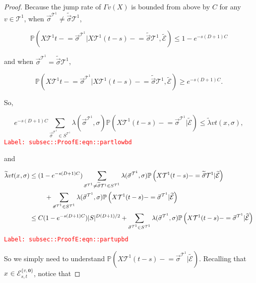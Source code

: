\documentclass[12pt]{article}
\newcommand{\mb}{\mathbb}
\newcommand{\mc}{\mathcal}
\newcommand{\tr}{\textcolor{red}}
\newcommand{\labe}[1]{\tr{\texttt{Label: #1}}}
\newcommand{\pr}{\mb{P}}							%
\renewcommand{\root}{\mathbf{0}}				%
\renewcommand{\v}{v}							%
\renewcommand{\S}{S}							%
\newcommand{\s}{\sigma}							%
\newcommand{\sv}{\vec{\s}}						%
\newcommand{\x}{x}								%
\renewcommand{\t}{t}							%
\renewcommand{\tt}{s}							%
\newcommand{\X}{X}								%
\newcommand{\carp}[1]{^{#1}}					%
\newcommand{\vsi}[1]{^{#1}}						%
\newcommand{\cind}[1]{_{#1}}					%
\newcommand{\tip}[1]{#1}						%
\newcommand{\const}{C}							%
\newcommand{\degr}{D}							%
\newcommand{\tree}{\mc{T}}						%
\newcommand{\sln}[1]{^{#1}}						%
\newcommand{\rate}{\lambda}						%
\newcommand{\alt}[1]{\widetilde{#1}}			%
\newcommand{\evnt}{\mc{E}}						%
\newcommand{\pmap}{\Gamma}						%
\newcommand{\crate}{\alt{\lambda}}				%
\begin{document}
\begin{proof}
Because the jump rate of \(\pmap{\v}(\X{}{})\) is bounded from above by \(\const{}\) for any \(\v\in\tree\sln{1}\),  when \(\sv\cind{}\vsi{\tree\sln{1}}\neq\alt{\sv}{}{\tree\sln{1}}\), 

\[\pr\left(\X{\tree\sln{1}}{\t-} = \sv\cind{}\vsi{\tree\sln{1}}|\X{\tree\sln{1}}{(\t-\tt)-}=\alt{\sv}{}{\tree\sln{1}},\alt{\evnt}{	}\right) \leq 1-e^{-\tt(\degr+1)\const{}}\]

and when \(\sv\cind{}\vsi{\tree\sln{1}}=\alt{\sv}{}{\tree\sln{1}}\),

\[\pr\left(\X{\tree\sln{1}}{\t-} = \sv\cind{}\vsi{\tree\sln{1}}|\X{\tree\sln{1}}{(\t-\tt)-}=\alt{\sv}{}{\tree\sln{1}},\alt{\evnt}{	}\right) \geq e^{-\tt(\degr+1)\const{}}.\]

So,

\begin{equation}
e^{-\tt(\degr+1)\const{}}\sum_{\sv\cind{}\vsi{\tree\sln{1}}\in \S\carp{\tree\sln{1}}} \rate{}(\sv\cind{}\vsi{\tree\sln{1}},\s)\pr\left(\X{\tree\sln{1}}{(\t-\tt)-}=\sv\cind{}\vsi{\tree\sln{1}}|\alt{\evnt}{	}\right) \leq \crate{\v}{\t}(\x\cind{}\tip{},\s),
\label{subsec::ProofE:eqn::partlowbd}
\end{equation}
\labe{subsec::ProofE:eqn::partlowbd}

and

\begin{align}
\crate{\v}{\t}(\x\cind{}\tip{},\s)&\leq (1 - e^{-\tt(\degr+1)\const{}})\sum_{\sv\cind{}\vsi{\tree\sln{1}}\neq \alt{\sv}{}{\tree\sln{1}} \in \S\carp{\tree\sln{1}}} \rate{}(\sv\cind{}\vsi{\tree\sln{1}},\s)\pr\left(\X{\tree\sln{1}}{(\t-\tt)-}=\alt{\sv}{}{\tree\sln{1}}|\alt{\evnt}{	}\right)\nonumber\\
&\hspace{24 pt} +\sum_{\sv\cind{}\vsi{\tree\sln{1}} \in \S\carp{\tree\sln{1}}} \rate{}(\sv\cind{}\vsi{\tree\sln{1}},\s)\pr\left(\X{\tree\sln{1}}{(\t-\tt)-}=\sv\cind{}\vsi{\tree\sln{1}}|\alt{\evnt}{	}\right)\nonumber\\
&\leq \const{}(1 - e^{-\tt(\degr+1)\const{}})|\S|^{\degr(\degr+1)/2} + \sum_{\sv\cind{}\vsi{\tree\sln{1}} \in \S\carp{\tree\sln{1}}} \rate{}(\sv\cind{}\vsi{\tree\sln{1}},\s)\pr\left(\X{\tree\sln{1}}{(\t-\tt)-}=\sv\cind{}\vsi{\tree\sln{1}}|\alt{\evnt}{	}\right)
\label{subsec::ProofE:eqn::partupbd}
\end{align}
\labe{subsec::ProofE:eqn::partupbd}

So we simply need to understand \(\pr\left(\X{\tree\sln{1}}{(\t-\tt)-}=\sv\cind{}\vsi{\tree\sln{1}}|\alt{\evnt}{	}\right)\). Recalling that \(\x\cind{}\tip{} \in \evnt{}^{\{\v,\root\}}_{\tt,\t}\), notice that


\end{proof}
\end{document}
